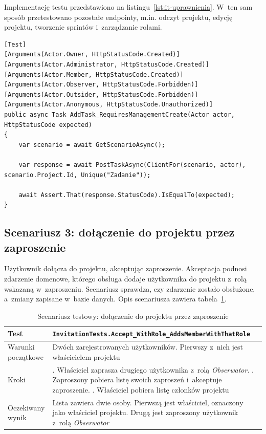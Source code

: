 Implementację testu przedstawiono na listingu~\ref{lst:it-uprawnienia}. W~ten sam sposób przetestowano pozostałe
endpointy, m.in. odczyt projektu, edycję projektu, tworzenie sprintów i~zarządzanie rolami.

\begin{lstlisting}[basicstyle=\footnotesize\ttfamily, captionpos=t, caption={Test uprawnień do tworzenia zadań}, label={lst:it-uprawnienia}]
[Test]
[Arguments(Actor.Owner, HttpStatusCode.Created)]
[Arguments(Actor.Administrator, HttpStatusCode.Created)]
[Arguments(Actor.Member, HttpStatusCode.Created)]
[Arguments(Actor.Observer, HttpStatusCode.Forbidden)]
[Arguments(Actor.Outsider, HttpStatusCode.Forbidden)]
[Arguments(Actor.Anonymous, HttpStatusCode.Unauthorized)]
public async Task AddTask_RequiresManagementCreate(Actor actor, HttpStatusCode expected)
{
    var scenario = await GetScenarioAsync();

    var response = await PostTaskAsync(ClientFor(scenario, actor), scenario.Project.Id, Unique("Zadanie"));

    await Assert.That(response.StatusCode).IsEqualTo(expected);
}
\end{lstlisting}

\subsection{Scenariusz 3: dołączenie do projektu przez zaproszenie}
Użytkownik dołącza do projektu, akceptując zaproszenie. Akceptacja podnosi zdarzenie domenowe, którego obsługa dodaje
użytkownika do projektu z~rolą wskazaną w~zaproszeniu. Scenariusz sprawdza, czy zdarzenie zostało obsłużone, a~zmiany
zapisane w~bazie danych. Opis scenariusza zawiera tabela~\ref{tab:it-zaproszenie}.

\begin{table}[htb]
    \centering
    \caption{Scenariusz testowy: dołączenie do projektu przez zaproszenie}
    \label{tab:it-zaproszenie}
    \small
    \begin{tabularx}{\linewidth}{@{}>{\raggedright\arraybackslash}p{3.5cm} >{\raggedright\arraybackslash}X@{}}
        \hline
        Test & \texttt{InvitationTests.\allowbreak{}Accept\_\allowbreak{}WithRole\_\allowbreak{}AddsMemberWithThatRole} \\ \hline
        Warunki początkowe & Dwóch zarejestrowanych użytkowników. Pierwszy z~nich jest właścicielem projektu \\ \hline
        Kroki & 1. Właściciel zaprasza drugiego użytkownika z~rolą \textit{Obserwator}. \newline 2. Zaproszony pobiera listę swoich zaproszeń i~akceptuje zaproszenie. \newline 3. Właściciel pobiera listę członków projektu \\ \hline
        Oczekiwany wynik & Lista zawiera dwie osoby. Pierwszą jest właściciel, oznaczony jako właściciel projektu. Drugą jest zaproszony użytkownik z~rolą \textit{Obserwator} \\ \hline
    \end{tabularx}
\end{table}


